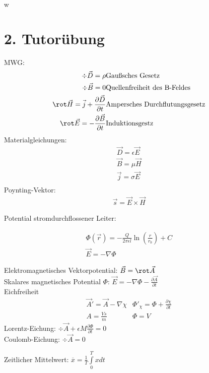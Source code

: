 w\documentclass[]{article}
\begin{document}
\section*{2. Tutorübung}
MWG: 
\begin{eqnarray}
\div \vec D = \rho &  \text{Gaußsches Gesetz} \\
\div \vec B = 0 & \text{Quellenfreiheit des B-Feldes} \\
\rot \vec H = \vec j + \frac{\partial \vec D}{\partial t} & \text{Ampersches Durchflutungsgesetz} \\
\rot \vec E = - \frac{\partial \vec B}{\partial t} & \text{Induktionsgestz}
\end{eqnarray}
Materialgleichungen: 
\begin{eqnarray}
\vec D = \epsilon \vec E \\
\vec B = \mu \vec H \\
\vec j = \sigma \vec E \\
\end{eqnarray}
Poynting-Vektor:
\begin{eqnarray}
\vec s = \vec E \times \vec H
\end{eqnarray}

Potential stromdurchflossener Leiter:

\begin{eqnarray}
\Phi (\vec r) = - \frac{Q}{2 \pi \epsilon l} \ln (\frac{r}{r_0}) + C \\
\vec E = - \nabla \Phi
\end{eqnarray}

Elektromagnetisches Vektorpotential: $\vec B = \rot \vec A$ \\
Skalares magnetisches Potential $\Phi$: $\vec E = - \nabla \Phi - \frac{\partial \vec A}{\partial t}$
\\
Eichfreiheit
\begin{eqnarray}
\vec A' = \vec A - \nabla \chi & \Phi'_\chi = \Phi + \frac{\partial \chi}{\partial t} \\
A = \frac{Vs}{m} & \Phi = V
\end{eqnarray}
Lorentz-Eichung: $\div \vec A + \epsilon M \frac{\partial \Phi}{\partial t} = 0$ \\
Coulomb-Eichung:  $\div \vec A = 0$

Zeitlicher Mittelwert: $ \overline{x} = \frac{1}{T} \int \limits_0^T x dt$
\end{document}
